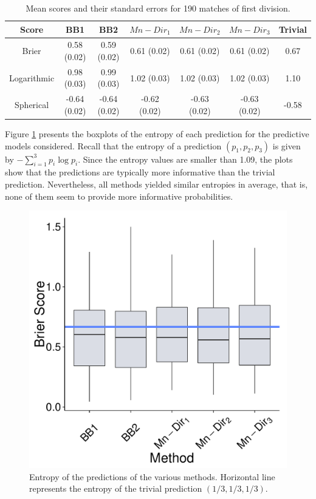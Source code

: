 \documentclass[journal,article,accept,moreauthors,pdftex,12pt,a4paper]{mdpi}
\begin{document}
	
	\begin{table}[H]
		\begin{center}
			\begin{tabular}{ccccccc}
				\hline
				Score & BB1 & BB2 & $Mn-Dir_1$ & $Mn-Dir_2$ & $Mn-Dir_3$ & Trivial \\
				\hline
				\hline
				Brier &0.58 (0.02) & 0.59 (0.02)& 0.61 (0.02)& 0.61 (0.02) & 0.61  (0.02) & 0.67 \\
				Logarithmic & 0.98 (0.03) & 0.99 (0.03) & 1.02 (0.03)  & 1.02 (0.03)  & 1.02 (0.03) & 1.10  \\
				Spherical &  -0.64 (0.02)& -0.64 (0.02)& -0.62 (0.02)& -0.63 (0.02)& -0.63 (0.02)& -0.58\\
				\hline
			\end{tabular}
			\caption{Mean scores and their standard errors for 190 matches of first division.}
			\label{tab::brier}
		\end{center}
	\end{table}
	
	
	Figure \ref{fig::entropy} presents the boxplots of the entropy of each prediction for the predictive models considered. Recall
	that the entropy of a prediction $(p_1,p_2,p_3)$ is given by $- \sum_{i=1}^3 p_i \log{p_i}$.
	Since the entropy values are smaller than 1.09, the plots show that the predictions
	are typically more informative than the trivial prediction. Nevertheless, all methods yielded similar entropies in average, that is,
	none of them seem to provide more informative probabilities.
	
	
	
	\begin{figure}[H]
		\centering
		\includegraphics[page=10,scale=0.3]{futebolComparacaoModelosForPaper.pdf}
		\caption{Entropy of the predictions of the various methods. Horizontal line represents the entropy of the trivial prediction $(1/3,1/3,1/3)$.}
		\label{fig::entropy}
	\end{figure}
	
\end{document}
